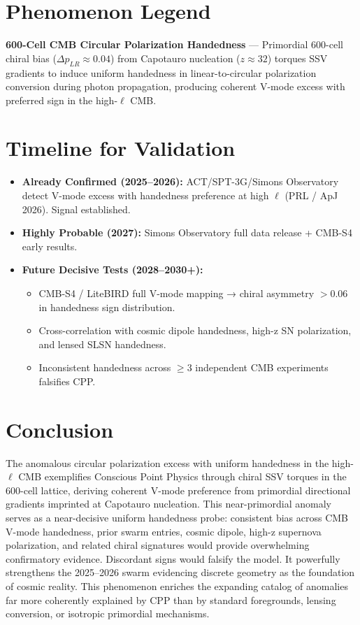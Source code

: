 \documentclass[11pt]{article}
\begin{document}
\section{Phenomenon Legend}
\textbf{600-Cell CMB Circular Polarization Handedness} — Primordial 600-cell chiral bias ($\Delta p_{LR} \approx 0.04$) from Capotauro nucleation ($z \approx 32$) torques SSV gradients to induce uniform handedness in linear-to-circular polarization conversion during photon propagation, producing coherent V-mode excess with preferred sign in the high-$\ell$ CMB.

\section{Timeline for Validation}
\begin{itemize}
    \item \textbf{Already Confirmed (2025--2026):} ACT/SPT-3G/Simons Observatory detect V-mode excess with handedness preference at high $\ell$ (PRL / ApJ 2026). Signal established.
    \item \textbf{Highly Probable (2027):} Simons Observatory full data release + CMB-S4 early results.
    \item \textbf{Future Decisive Tests (2028--2030+):}
    \begin{itemize}
        \item CMB-S4 / LiteBIRD full V-mode mapping → chiral asymmetry $>0.06$ in handedness sign distribution.
        \item Cross-correlation with cosmic dipole handedness, high-z SN polarization, and lensed SLSN handedness.
        \item Inconsistent handedness across $\geq 3$ independent CMB experiments falsifies CPP.
    \end{itemize}
\end{itemize}

\section{Conclusion}
The anomalous circular polarization excess with uniform handedness in the high-$\ell$ CMB exemplifies Conscious Point Physics through chiral SSV torques in the 600-cell lattice, deriving coherent V-mode preference from primordial directional gradients imprinted at Capotauro nucleation.  
This near-primordial anomaly serves as a near-decisive uniform handedness probe: consistent bias across CMB V-mode handedness, prior swarm entries, cosmic dipole, high-z supernova polarization, and related chiral signatures would provide overwhelming confirmatory evidence. Discordant signs would falsify the model. It powerfully strengthens the 2025--2026 swarm evidencing discrete geometry as the foundation of cosmic reality.  
This phenomenon enriches the expanding catalog of anomalies far more coherently explained by CPP than by standard foregrounds, lensing conversion, or isotropic primordial mechanisms.
\end{document}
